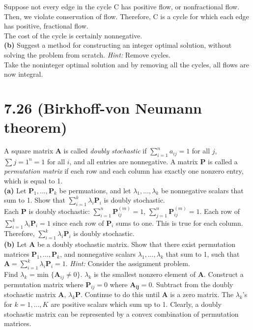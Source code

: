 \documentclass{article}
\begin{document}
\noindent
Suppose not every edge in the cycle C has positive flow, or nonfractional flow.  Then, we violate conservation of flow.  Therefore, C is a cycle for which each edge has positive, fractional flow.\\

\noindent
The cost of the cycle is certainly nonnegative.  \\

\noindent \textbf{(b)}  Suggest a method for constructing an integer optimal solution, without solving the problem from scratch.  \emph{Hint:}  Remove cycles. \\

\noindent
Take the noninteger optimal solution and by removing all the cycles, all flows are now integral.

\section*{7.26 (Birkhoff-von Neumann theorem)}
A square matrix $\mathbf{A}$ is called \emph{doubly stochastic} if $\sum_{i=1}^n a_{ij} = 1$ for all $j$, $\sum{j=1}^n = 1$ for all $i$, and all entries are nonnegative.  A matrix $\mathbf{P}$ is called a \emph{permutation matrix} if each row and each column has exactly one nonzero entry, which is equal to 1. \\

\noindent \textbf{(a)}
Let $\mathbf{P}_1, \ldots, \mathbf{P}_k$ be permuations, and let $\lambda_1, \ldots, \lambda_k$ be nonnegative scalars that sum to 1.  Show that $\sum_{i=1}^k \lambda_i \mathbf{P}_i$ is doubly stochastic. \\

\noindent
Each $\mathbf{P}$ is doubly stochastic:  $\displaystyle \sum_{i=1}^n \mathbf{P}_{ij}^{(m)} = 1$, $\displaystyle \sum_{j=1}^n \mathbf{P}_{ij}^{(m)} = 1$.  Each row of $\displaystyle \sum_{i=1}^k \lambda_i \mathbf{P}_i = 1$ since each row of $\mathbf{P}_i$ sums to one.  This is true for each column.  Therefore, $\displaystyle \sum_{i=1}^k \lambda_i \mathbf{P}_i$ is doubly stochastic. \\

\noindent \textbf{(b)}
Let $\mathbf{A}$ be a doubly stochastic matrix.  Show that there exist permutation matrices $\mathbf{P}_1, \ldots, \mathbf{P}_k$, and nonnegative scalars $\lambda_1, \ldots, \lambda_k$ that sum to 1, such that $\mathbf{A} = \sum_{i=1}^k \lambda_i \mathbf{P}_i = 1$.  \emph{Hint:} Consider the assignment problem. \\

\noindent
Find $\lambda_k$ = min $\{ \mathbf{A}_{ij} \neq 0\}$.  $\lambda_k$ is the smallest nonzero element of $\mathbf{A}$.  Construct a permutation matrix where $\mathbf{P}_{ij} = 0$ where $\mathbf{A_{ij}}=0$.  Subtract from the doubly stochastic matrix $\mathbf{A}$, $\lambda_k \mathbf{P}$.  Continue to do this until $\mathbf{A}$ is a zero matrix.  The $\lambda_k$'s for $k = 1, \ldots, K$ are positive scalars which sum up to 1.  Clearly, a doubly stochastic matrix can be represented by a convex combination of permutation matrices.\\ 
\end{document}
